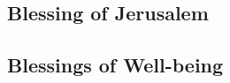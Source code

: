 ﻿\documentclass[a5paper, 12pt]{Birchon}
\begin{document}
\eject

\begin{english}
\subsection*{Blessing of Jerusalem}
\end{english}

\eject

\begin{english}
\subsection*{Blessings of Well-being}
\end{english}

\eject
\end{document}
